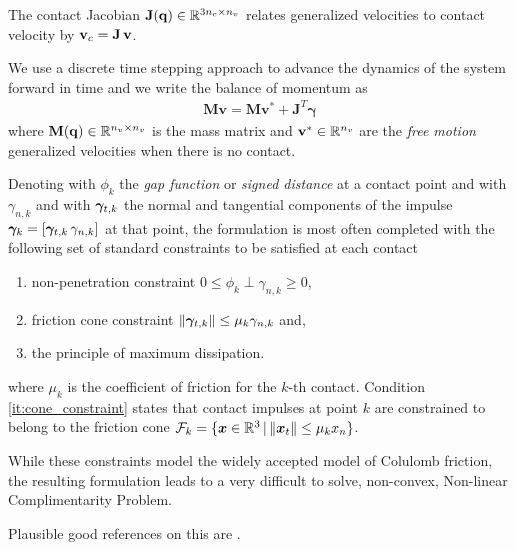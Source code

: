The contact Jacobian ${\mathbf{J}}({\mathbf{q}})\in\mathbb{R}^{3n_c\times n_v}$ relates
generalized velocities to contact velocity by ${\mathbf{v}}_c={\mathbf{J}}\,{\mathbf{v}}$.

We use a discrete time stepping approach to advance the dynamics of the system
forward in time and we write the balance of momentum as
\begin{eqnarray}
	\mathbf{M}\mathbf{v} = \mathbf{M}\mathbf{v}^* + \mathbf{J}^T\mathbf{\gamma}
	\label{eq:momentum_balance}
\end{eqnarray}
where ${\mathbf{M}}({\mathbf{q}})\in\mathbb{R}^{n_v\times n_v}$ is the mass matrix and
${\mathbf{v}}^*\in\mathbb{R}^{n_v}$ are the \textit{free motion} generalized
velocities when there is no contact.

Denoting with $\phi_k$ the \textit{gap function} or \textit{signed distance} at
a contact point and with $\gamma_{n,k}$ and with ${\bm\gamma}_{t,k}$ the normal and
tangential components of the impulse ${\bm\gamma}_k=[{\bm\gamma}_{t,k}\,\gamma_{n,k}]$
at that point, the formulation is most often completed with the following set of
standard constraints to be satisfied at each contact
\begin{enumerate}
	\item non-penetration constraint $0\le\phi_k\perp\gamma_{n,k}\ge0$,
	\item\label{it:cone_constraint} friction cone constraint
	$\Vert{\bm\gamma}_{t,k}\Vert\le \mu_k\gamma_{n,k}$ and,
	\item the principle of maximum dissipation.
\end{enumerate}
where $\mu_k$ is the coefficient of friction for the $k\text{-th}$ contact.
Condition \ref{it:cone_constraint} states that contact impulses at point $k$ are
constrained to belong to the friction cone
$\mathcal{F}_k=\{{\bm{x}}\in\mathbb{R}^3 \,|\, \Vert{\bm{x}}_t\Vert\le \mu_k x_n\}$.

While these constraints model the widely accepted model of Colulomb friction,
the resulting formulation leads to a very difficult to solve, non-convex,
Non-linear Complimentarity Problem. 



Plausible good references on this are
\cite{bib:stewart1996implicit,bib:stewart2000implicit,bib:chakraborty2007implicit,bib:acary2018solving,bib:pang1999unified,bib:alart2018inconsistency}.

